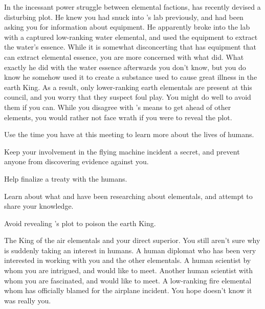 \documentclass[char]{elementals}
\begin{document}
In the incessant power struggle between elemental factions, \cKing{} has recently devised a disturbing plot.  He knew you had snuck into \cGD{}'s lab previously, and had been asking you for information about  equipment. He apparently broke into the lab with a captured low-ranking water elemental, and used the equipment to extract the water's essence.  While it is somewhat disconcerting that \cGD{} has equipment that can extract elemental essence, you are more concerned with what \cKing{} did.  What exactly he did with the water essence afterwards you don't know, but you do know he somehow used it to create a substance used to cause great illness in the earth King.  As a result, only lower-ranking earth elementals are present at this council, and you worry that they suspect foul play.  You might do well to avoid them if you can.  While you disagree with \cKing{}'s means to get ahead of other elements, you would rather not face \cKing{\their} wrath if you were to reveal the plot.  

\begin{itemz}[Goals]
  \item Use the time you have at this meeting to learn more about the lives of humans.
  \item Keep your involvement in the flying machine incident a secret, and prevent anyone from discovering evidence against you.
  \item Help \cKing{} finalize a treaty with the humans.
  \item Learn about what \cGD{} and \cScientist{} have been researching about elementals, and attempt to share your knowledge.  
  \item Avoid revealing \cKing{}'s plot to poison the earth King.
\end{itemz}

\begin{contacts}
	\contact{\cKing{\intro}} The King of the air elementals and your direct superior.  You still aren't sure why \cKing{\they} is suddenly taking an interest in humans.
  \contact{\cDiplomat{\intro}} A human diplomat who has been very interested in working with you and the other elementals.
  \contact{\cGD{\intro}} A human scientist by whom you are intrigued, and would like to meet.
  \contact{\cScientist{\intro}} Another human scientist with whom you are fascinated, and would like to meet.
  \contact{\cJuliet{\intro}} A low-ranking fire elemental whom \cKing{} has officially blamed for the airplane incident.  You hope \cJuliet{\they} doesn't know it was really you.
\end{contacts} 
\end{document}
